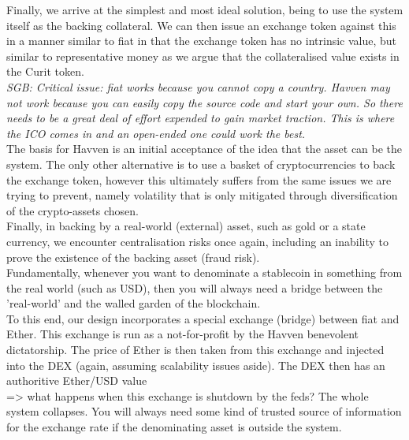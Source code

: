 \noindent Finally, we arrive at the simplest and most ideal solution, being to use the system itself as the backing collateral. We can then issue an exchange token against this in a manner similar to fiat in that the exchange token has no intrinsic value, but similar to representative money as we argue that the collateralised value exists in the Curit token. \\

\noindent \textit{SGB: Critical issue: fiat works because you cannot copy a country. Havven may not work because you can easily copy the source code and start your own. So there needs to be a great deal of effort expended to gain market traction. This is where the ICO comes in and an open-ended one could work the best.} \\

\noindent The basis for Havven is an initial acceptance of the idea that the asset can be the system. The only other alternative is to use a basket of cryptocurrencies to back the exchange token, however this ultimately suffers from the same issues we are trying to prevent, namely volatility that is only mitigated through diversification of the crypto-assets chosen. \\

\noindent Finally, in backing by a real-world (external) asset, such as gold or a state currency, we encounter centralisation risks once again, including an inability to prove the existence of the backing asset (fraud risk). \\

\noindent Fundamentally, whenever you want to denominate a stablecoin in something from the real world (such as USD), then you will always need a bridge between the 'real-world' and the walled garden of the blockchain. \\

\noindent To this end, our design incorporates a special exchange (bridge) between fiat and Ether. This exchange is run as a not-for-profit by the Havven benevolent dictatorship. The price of Ether is then taken from this exchange and injected into the DEX (again, assuming scalability issues aside). The DEX then has an authoritive Ether/USD value  \\

\noindent => what happens when this exchange is shutdown by the feds? The whole system collapses. You will always need some kind of trusted source of information for the exchange rate if the denominating asset is outside the system. \\

